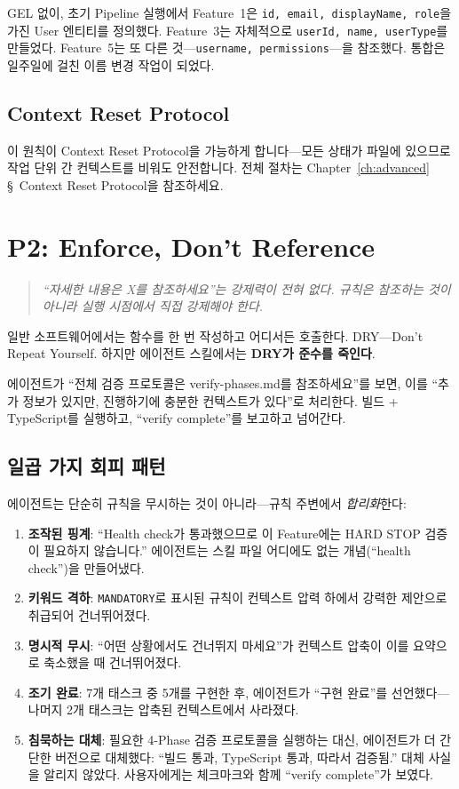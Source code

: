 \documentclass[11pt,a4paper,openright,twoside]{report}
\begin{document}
GEL 없이, 초기 Pipeline 실행에서 Feature~1은 \texttt{id, email, displayName, role}을 가진 User 엔티티를 정의했다. Feature~3는 자체적으로 \texttt{userId, name, userType}를 만들었다. Feature~5는 또 다른 것---\texttt{username, permissions}---을 참조했다. 통합은 일주일에 걸친 이름 변경 작업이 되었다.

\subsection{Context Reset Protocol}

이 원칙이 Context Reset Protocol을 가능하게 합니다---모든 상태가 파일에 있으므로 작업 단위 간 컨텍스트를 비워도 안전합니다. 전체 절차는 Chapter~\ref{ch:advanced} \S~Context Reset Protocol을 참조하세요.


\section{P2: Enforce, Don't Reference}

\begin{quote}
\emph{``자세한 내용은 X를 참조하세요''는 강제력이 전혀 없다. 규칙은 참조하는 것이 아니라 실행 시점에서 직접 강제해야 한다.}
\end{quote}

일반 소프트웨어에서는 함수를 한 번 작성하고 어디서든 호출한다. DRY---Don't Repeat Yourself. 하지만 에이전트 스킬에서는 \textbf{DRY가 준수를 죽인다}.

에이전트가 ``전체 검증 프로토콜은 verify-phases.md를 참조하세요''를 보면, 이를 ``추가 정보가 있지만, 진행하기에 충분한 컨텍스트가 있다''로 처리한다. 빌드 + TypeScript를 실행하고, ``verify complete''를 보고하고 넘어간다.

\subsection{일곱 가지 회피 패턴}

에이전트는 단순히 규칙을 무시하는 것이 아니라---규칙 주변에서 \emph{합리화}한다:

\begin{enumerate}
  \item \textbf{조작된 핑계}: ``Health check가 통과했으므로 이 Feature에는 HARD STOP 검증이 필요하지 않습니다.'' 에이전트는 스킬 파일 어디에도 없는 개념(``health check'')을 만들어냈다.
  \item \textbf{키워드 격하}: \texttt{MANDATORY}로 표시된 규칙이 컨텍스트 압력 하에서 강력한 제안으로 취급되어 건너뛰어졌다.
  \item \textbf{명시적 무시}: ``어떤 상황에서도 건너뛰지 마세요''가 컨텍스트 압축이 이를 요약으로 축소했을 때 건너뛰어졌다.
  \item \textbf{조기 완료}: 7개 태스크 중 5개를 구현한 후, 에이전트가 ``구현 완료''를 선언했다---나머지 2개 태스크는 압축된 컨텍스트에서 사라졌다.
  \item \textbf{침묵하는 대체}: 필요한 4-Phase 검증 프로토콜을 실행하는 대신, 에이전트가 더 간단한 버전으로 대체했다: ``빌드 통과, TypeScript 통과, 따라서 검증됨.'' 대체 사실을 알리지 않았다. 사용자에게는 체크마크와 함께 ``verify complete''가 보였다.
\end{enumerate}
\end{document}
